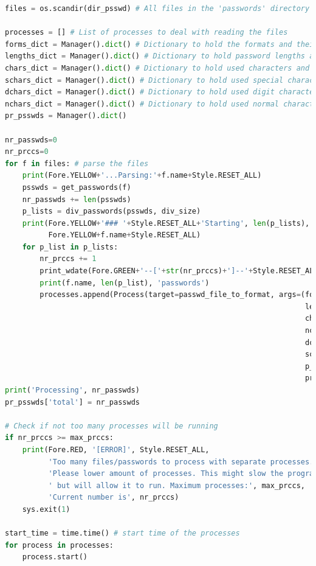 \documentclass[a4paper,12pt]{article}
\begin{document}
\begin{lstlisting}[language=Python]
files = os.scandir(dir_psswd) # All files in the 'passwords' directory as a generator for efficiency

processes = [] # List of processes to deal with reading the files
forms_dict = Manager().dict() # Dictionary to hold the formats and their count
lengths_dict = Manager().dict() # Dictionary to hold password lengths and their count
chars_dict = Manager().dict() # Dictionary to hold used characters and their count
schars_dict = Manager().dict() # Dictionary to hold used special characters and their count
dchars_dict = Manager().dict() # Dictionary to hold used digit characters and their count
nchars_dict = Manager().dict() # Dictionary to hold used normal characters and their count
pr_psswds = Manager().dict()

nr_passwds=0
nr_prccs=0
for f in files: # parse the files
    print(Fore.YELLOW+'...Parsing:'+f.name+Style.RESET_ALL)
    psswds = get_passwords(f)
    nr_passwds += len(psswds)
    p_lists = div_passwords(psswds, div_size)
    print(Fore.YELLOW+'### '+Style.RESET_ALL+'Starting', len(p_lists), 'processes for',
          Fore.YELLOW+f.name+Style.RESET_ALL)
    for p_list in p_lists:
        nr_prccs += 1
        print_wdate(Fore.GREEN+'--['+str(nr_prccs)+']--'+Style.RESET_ALL, end='')
        print(f.name, len(p_list), 'passwords')
        processes.append(Process(target=passwd_file_to_format, args=(forms_dict,
                                                                     lengths_dict,
                                                                     chars_dict,
                                                                     nchars_dict,
                                                                     dchars_dict,
                                                                     schars_dict,
                                                                     p_list,f,nr_prccs,
                                                                     pr_psswds)))
print('Processing', nr_passwds)
pr_psswds['total'] = nr_passwds
        
# Check if not too many processes will be running
if nr_prccs >= max_prccs:
    print(Fore.RED, '[ERROR]', Style.RESET_ALL,
          'Too many files/passwords to process with separate processes. '\
          'Please lower amount of processes. This might slow the program down,'\
          ' but will allow it to run. Maximum processes:', max_prccs,
          'Current number is', nr_prccs)
    sys.exit(1)

start_time = time.time() # start time of the processes
for process in processes:
    process.start()


\end{lstlisting}
\end{document}
